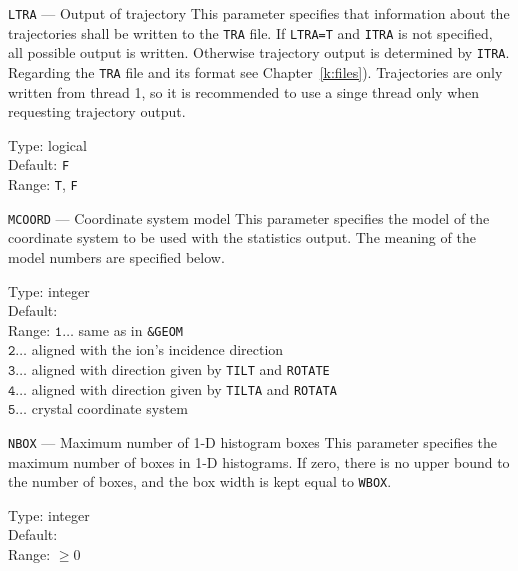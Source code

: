 \begin{keydescription}{\texttt{LTRA} --- Output of trajectory}
%
  This parameter specifies that information about the trajectories shall be written to the 
  \texttt{TRA} file. 
  If \texttt{LTRA=T} and \texttt{ITRA} is not specified, all possible output is written. 
  Otherwise trajectory output is determined by \texttt{ITRA}.
  Regarding the \texttt{TRA} file and its format see Chapter~\ref{k:files}). 
  Trajectories are only written from thread 1, so it is recommended to use a singe thread 
  only when requesting trajectory output.
  \begin{keytab}
    Type:    \> logical \\
    Default: \> \texttt{F} \\
    Range:   \> \texttt{T}, \texttt{F} 
  \end{keytab}
\end{keydescription}

\begin{keydescription}{\texttt{MCOORD} --- Coordinate system model}
%
  This parameter specifies the model of the coordinate system to be used with the statistics 
  output. The meaning of the model numbers are specified below.
  \begin{keytab}
    Type:    \> integer \\
    Default:  \\
    Range:   \> $\texttt{1} \ldots $ same as in \texttt{\&GEOM} \\
             \> $\texttt{2} \ldots $ aligned with the ion's incidence direction \\
             \> $\texttt{3} \ldots $ aligned with direction given by \texttt{TILT} and 
                \texttt{ROTATE} \\
             \> $\texttt{4} \ldots $ aligned with direction given by \texttt{TILTA} and 
                \texttt{ROTATA} \\
             \> $\texttt{5} \ldots $ crystal coordinate system
  \end{keytab}
\end{keydescription}

\begin{keydescription}{\texttt{NBOX} --- Maximum number of 1-D histogram boxes}
%
  This parameter specifies the maximum number of boxes in 1-D histograms. If
  zero, there is no upper bound to the number of boxes, and the box width is
  kept equal to \texttt{WBOX}.
  \begin{keytab}
    Type:    \> integer \\
    Default:  \\
    Range:   \> $\ge 0$
  \end{keytab}
\end{keydescription}

